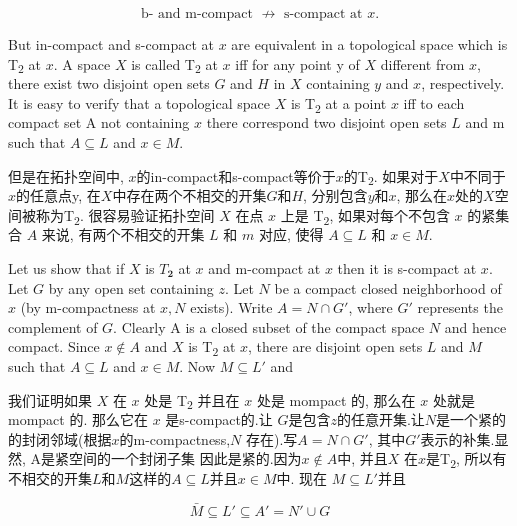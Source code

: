 \documentclass[options]{article}
\begin{document}
\[
		\text { b- and m-compact } \not\longrightarrow \text { s-compact at } x \text {. }
\]
\begin{paracol}{2}
	\begin{en}
		But in-compact and s-compact at $x$ are equivalent in a topological space which is T\textsubscript{\!$2$} at $x$. A space $X$ is called T\textsubscript{\!$2$} at $x$ iff for any point y of $X$ different from $x$, there exist two disjoint open sets $G$ and $H$ in $X$ containing $y$ and $x$, respectively. It is easy to verify that a topological space $X$ is T\textsubscript{\!$2$} at a point $x$ iff to each compact set A not containing $x$ there correspond two disjoint open sets $L$ and m such that $A \subseteq L$ and $x \in M$.
	\end{en}
	\begin{cn}
		但是在拓扑空间中, $x$的in-compact和s-compact等价于$x$的T\textsubscript{\!$2$}. 如果对于$X$中不同于$x$的任意点y, 在$X$中存在两个不相交的开集$G$和$H$, 分别包含$y$和$x$, 那么在$x$处的$X$空间被称为T\textsubscript{\!$2$}. 很容易验证拓扑空间 $X$ 在点 $x$ 上是 T\textsubscript{\!$2$}, 如果对每个不包含 $x$ 的紧集合 $A$ 来说, 有两个不相交的开集 $ L$ 和 $m$ 对应, 使得 $A \subseteq L$ 和 $x \in M$.
	\end{cn}
	\begin{en}
		Let us show that if $X$ is $T_{\mathbf{2}}$ at $x$ and
		m-compact at $x$ then it is s-compact at $x$. Let
		$G$ by any open set containing $z$. Let $N$ be a compact
		closed neighborhood of $x$ (by m-compactness at $x, N$
		exists). Write $A=N \cap G'$, where $G'$ represents the
		complement of $G$. Clearly A is a closed subset of the compact space
		$N$ and hence compact. Since $x \notin A$ and $X$
		is T\textsubscript{\!$2$} at $x$, there are disjoint open sets $ L$
		and $M$ such that $A \subseteq  L$ and $x \in M$. Now $M \subseteq  L'$ and

	\end{en}
	\begin{cn}
		我们证明如果 $X$ 在 $x$ 处是 T\textsubscript{\!$2$} 并且在 $x$ 处是 mompact 的, 那么在 $x$ 处就是 mompact 的.
		那么它在 $x$ 是s-compact的.让
		$G$是包含$z$的任意开集.让$N$是一个紧的
		的封闭邻域(根据$x$的m-compactness,$N$
		存在).写$A=N\cap G'$, 其中$G'$表示的补集.显然, A是紧空间的一个封闭子集
		因此是紧的.因为$x\not\in A$中, 并且$X$	在$x$是T\textsubscript{$\!2$}, 所以有不相交的开集$L$和$M$这样的$A\subseteq L$并且$x
		\in M$中. 现在 $M \subseteq L'$并且
	\end{cn}
\end{paracol}
\[
		\bar{M} \subseteq L' \subseteq A'=N' \cup G
\]
\end{document}
